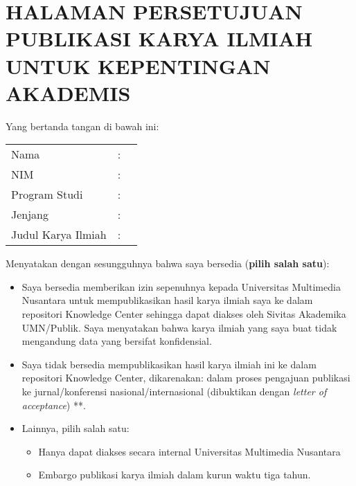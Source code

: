 \chapter*{HALAMAN PERSETUJUAN PUBLIKASI KARYA ILMIAH UNTUK KEPENTINGAN AKADEMIS}

\onehalfspacing

\noindent 
Yang bertanda tangan di bawah ini:

\begin{tabular}{p{3.7cm} l p{6.5cm}}
	Nama & : & \penulis \\ 	
	NIM & : & \nim \\
	Program Studi & : & \program\\	
	Jenjang & : & \jenjang\\
	Judul Karya Ilmiah & : & \judul \\
\end{tabular}

\noindent Menyatakan dengan sesungguhnya bahwa saya bersedia (\textbf{pilih salah satu}):
\begin{itemize}
    \renewcommand{\labelitemi}{${\rlap{\hspace{0.1em}$\checkmark$}}\square$}
    \item Saya bersedia memberikan izin sepenuhnya kepada Universitas Multimedia Nusantara untuk mempublikasikan hasil karya ilmiah saya ke dalam repositori Knowledge Center sehingga dapat diakses oleh Sivitas Akademika UMN/Publik. Saya menyatakan bahwa karya ilmiah yang saya buat tidak mengandung data yang bersifat konfidensial. 

    \renewcommand{\labelitemi}{$\square$}
    \item Saya tidak bersedia mempublikasikan hasil karya ilmiah ini ke dalam repositori Knowledge Center, dikarenakan: dalam proses pengajuan publikasi ke jurnal/konferensi nasional/internasional (dibuktikan dengan \textit{letter of acceptance}) **.
    \item Lainnya, pilih salah satu:
    \begin{itemize} 
    \renewcommand{\labelitemi}{$\square$}
        \item Hanya dapat diakses secara internal Universitas Multimedia Nusantara
        \item Embargo publikasi karya ilmiah dalam kurun waktu tiga tahun.
    \end{itemize}
\end{itemize}

